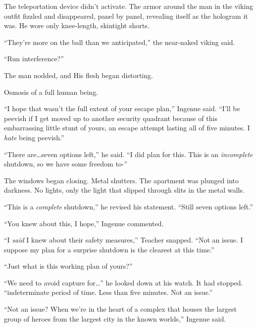 The teleportation device didn't activate.  The armor around the man in the viking outfit fizzled and disappeared, panel by panel, revealing itself as the hologram it was.  He wore only knee-length, skintight shorts.



``They're more on the ball than we anticipated,'' the near-naked viking said.



``Run interference?''



The man nodded, and His flesh began distorting.



Osmosis of a full human being.



``I hope that wasn't the full extent of your escape plan,'' Ingenue said.  ``I'll be peevish if I get moved up to another security quadrant because of this embarrassing little stunt of yours, an escape attempt lasting all of five minutes.  I \emph{hate} being peevish.''



``There are\ldots seven options left,'' he said.  ``I did plan for this.  This is an \emph{incomplete} shutdown, so we have some freedom to-''



The windows began closing.  Metal shutters.  The apartment was plunged into darkness.  No lights, only the light that slipped through slits in the metal walls.



``This is a \emph{complete} shutdown,'' he revised his statement.  ``Still seven options left.''



``You knew about this, I hope,'' Ingenue commented.



``I \emph{said} I knew about their safety measures,'' Teacher snapped.  ``Not an issue.  I suppose my plan for a surprise shutdown is the clearest at this time.''



``Just what is this working plan of yours?''



``We need to avoid capture for\ldots'' he looked down at his watch.  It had stopped.  ``\ldotsAn indeterminate period of time.  Less than five minutes.  Not an issue.''



``Not an issue?  When we're in the heart of a complex that houses the largest group of heroes from the largest city in the known worlds,'' Ingenue said.



